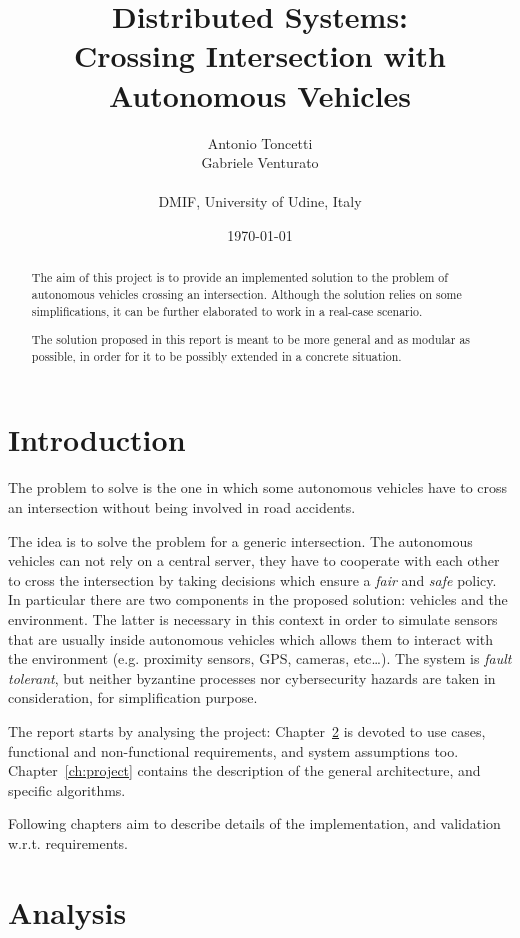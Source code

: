 \documentclass{memoir}
\title{Distributed Systems:\\Crossing Intersection with Autonomous Vehicles}
\author{Antonio Toncetti\\Gabriele Venturato\\\\DMIF, University of Udine, Italy}
\date{%
	\today}
\begin{document}
\maketitle
\begin{abstract}
The aim of this project is to provide an implemented solution to the problem of autonomous vehicles crossing an intersection.
Although the solution relies on some simplifications, it can be further elaborated to work in a real-case scenario.

The solution proposed in this report is meant to be more general and as modular as possible, in order for it to be possibly extended in a concrete situation.
\end{abstract}

\chapter{Introduction}\label{ch:intro}

The problem to solve is the one in which some autonomous vehicles have to cross an intersection without being involved in road accidents. 

The idea is to solve the problem for a generic intersection. The autonomous vehicles can not rely on a central server, they have to cooperate with each other to cross the intersection by taking decisions which ensure a \emph{fair} and \emph{safe} policy. In particular there are two components in the proposed solution: vehicles and the environment. The latter is necessary in this context in order to simulate sensors that are usually inside autonomous vehicles which allows them to interact with the environment (e.g. proximity sensors, GPS, cameras, etc\dots).
The system is \emph{fault tolerant}, but neither byzantine processes nor cybersecurity hazards are taken in consideration, for simplification purpose.

The report starts by analysing the project: Chapter~\ref{ch:analysis} is devoted to use cases, functional and non-functional requirements, and system assumptions too. Chapter~\ref{ch:project} contains the description of the general architecture, and specific algorithms.

Following chapters aim to describe details of the implementation, and validation w.r.t. requirements.



\chapter{Analysis}\label{ch:analysis}
\end{document}
